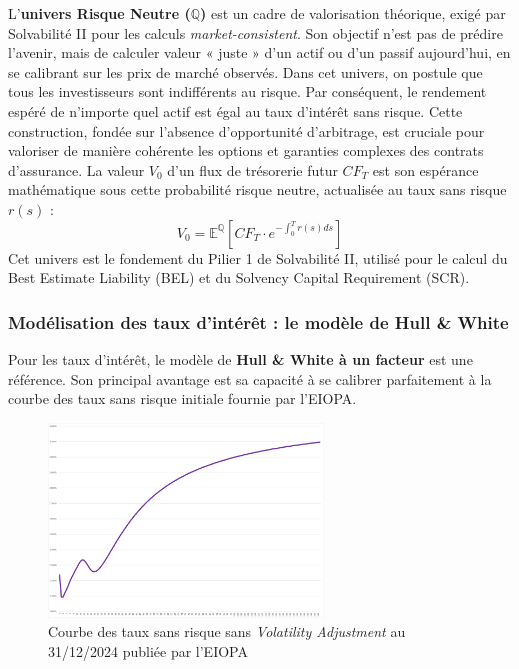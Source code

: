 L'\textbf{univers Risque Neutre ($\mathbb{Q}$)} est un cadre de valorisation théorique, exigé par Solvabilité II pour les calculs \textit{market-consistent}. Son objectif n'est pas de prédire l'avenir, mais de calculer valeur « juste » d'un actif ou d'un passif aujourd'hui, en se calibrant sur les prix de marché observés. Dans cet univers, on postule que tous les investisseurs sont indifférents au risque. Par conséquent, le rendement espéré de n'importe quel actif est égal au taux d'intérêt sans risque. Cette construction, fondée sur l'absence d'opportunité d'arbitrage, est cruciale pour valoriser de manière cohérente les options et garanties complexes des contrats d'assurance. La valeur $V_0$ d'un flux de trésorerie futur $CF_T$ est son espérance mathématique sous cette probabilité risque neutre, actualisée au taux sans risque $r(s)$ :
\begin{equation}
    V_0 = \mathbb{E}^{\mathbb{Q}} \left[ CF_T \cdot e^{-\int_0^T r(s)ds} \right]
\end{equation}
Cet univers est le fondement du Pilier 1 de Solvabilité II, utilisé pour le calcul du Best Estimate Liability (BEL) et du Solvency Capital Requirement (SCR).

\subsubsection{Modélisation des taux d'intérêt : le modèle de Hull \& White}
Pour les taux d'intérêt, le modèle de \textbf{Hull \& White à un facteur} est une référence. Son principal avantage est sa capacité à se calibrer parfaitement à la courbe des taux sans risque initiale fournie par l'EIOPA. 
\begin{figure}[H]
    \centering
    \includegraphics[width=0.65\textwidth]{images/2_chapitres/chapitre1/courbe_EIOPA.png}
    \caption{Courbe des taux sans risque sans \textit{Volatility Adjustment} au 31/12/2024 publiée par l'EIOPA}
    \label{fig:courbe_EIOPA}
\end{figure}

